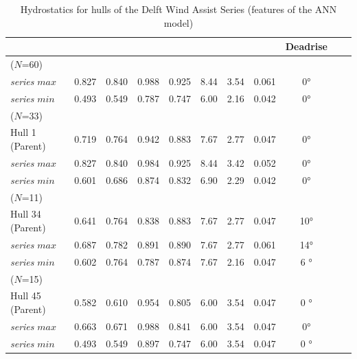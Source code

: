 \documentclass[twoside,twocolumn]{article}
\begin{document}
\begin{table}[b]
	\centering
	\caption{Hydrostatics for hulls of the Delft Wind Assist Series (features of the ANN model)}
	\begin{tabular}{p{2.8cm}*{10}{S}}
		\toprule
		& {\Cb} & {\Cp} & {\Cm} & {\Cwp} & {\LB} & {\BT} & {\TL}  & {Deadrise}         \\\midrule
		\DWA ($N$=60)            &       &       &       &        &       &       &         &                    \\ \midrule
		\textit{series} $max$ & 0.827 & 0.840 & 0.988 & 0.925  & 8.44  & 3.54  & 0.061   & \ang{0}                  \\
		\textit{series} $min$ & 0.493 & 0.549 & 0.787 & 0.747  & 6.00  & 2.16  & 0.042   & \ang{0}        { \bigskip} \\
		\firstseries ($N$=33)            &       &       &       &        &       &       &         &                    \\ \midrule
		Hull 1 (Parent)                & 0.719 & 0.764 & 0.942 & 0.883  & 7.67  & 2.77  & 0.047   & \ang{0}                  \\
		\textit{series} $max$     & 0.827 & 0.840 & 0.984 & 0.925  & 8.44  & 3.42  & 0.052   & \ang{0}                  \\
		\textit{series} $min$     & 0.601 & 0.686 & 0.874 & 0.832  & 6.90  & 2.29  & 0.042   & \ang{0}        { \bigskip} \\
		\secondseries ($N$=11)            &       &       &       &        &       &       &         &                    \\ \midrule
		Hull 34 (Parent)               & 0.641 & 0.764 & 0.838 & 0.883  & 7.67  & 2.77  & 0.047   & \ang{10}                 \\
		\textit{series} $max$     & 0.687 & 0.782 & 0.891 & 0.890  & 7.67  & 2.77  & 0.061   & \ang{14}                 \\
		\textit{series} $min$     & 0.602 & 0.764 & 0.787 & 0.874  & 7.67  & 2.16  & 0.047   & \ang{6 }       { \bigskip} \\
		\thirdseries ($N$=15)            &       &       &       &        &       &       &         &                    \\ \midrule
		Hull 45 (Parent)               & 0.582 & 0.610 & 0.954 & 0.805  & 6.00  & 3.54  & 0.047   & \ang{0 }                 \\
		\textit{series} $max$     & 0.663 & 0.671 & 0.988 & 0.841  & 6.00  & 3.54  & 0.047   & \ang{0}                  \\
		\textit{series} $min$     & 0.493 & 0.549 & 0.897 & 0.747  & 6.00  & 3.54  & 0.047   & \ang{0 }                 \\ \bottomrule
	\end{tabular}
	\label{tab:DWAsummary}
\end{table}
\end{document}
